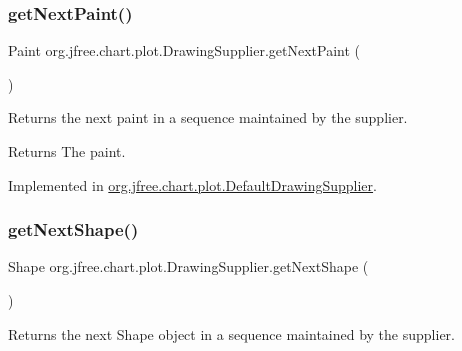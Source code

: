 \mbox{\label{interfaceorg_1_1jfree_1_1chart_1_1plot_1_1_drawing_supplier_ad7f6058a6390128ef1e52cddee4f8d0b}} 
\subsubsection{\texorpdfstring{get\+Next\+Paint()}{getNextPaint()}}
{\footnotesize\ttfamily Paint org.\+jfree.\+chart.\+plot.\+Drawing\+Supplier.\+get\+Next\+Paint (\begin{DoxyParamCaption}{ }\end{DoxyParamCaption})}

Returns the next paint in a sequence maintained by the supplier.

\begin{DoxyReturn}{Returns}
The paint. 
\end{DoxyReturn}


Implemented in \mbox{\hyperlink{classorg_1_1jfree_1_1chart_1_1plot_1_1_default_drawing_supplier_a4e1f7e6db7275fbe64dd76b6075556a9}{org.\+jfree.\+chart.\+plot.\+Default\+Drawing\+Supplier}}.

\mbox{\label{interfaceorg_1_1jfree_1_1chart_1_1plot_1_1_drawing_supplier_a003bd6d202ea37f0e20e8a63b6183525}} 
\subsubsection{\texorpdfstring{get\+Next\+Shape()}{getNextShape()}}
{\footnotesize\ttfamily Shape org.\+jfree.\+chart.\+plot.\+Drawing\+Supplier.\+get\+Next\+Shape (\begin{DoxyParamCaption}{ }\end{DoxyParamCaption})}

Returns the next {\ttfamily Shape} object in a sequence maintained by the supplier.

